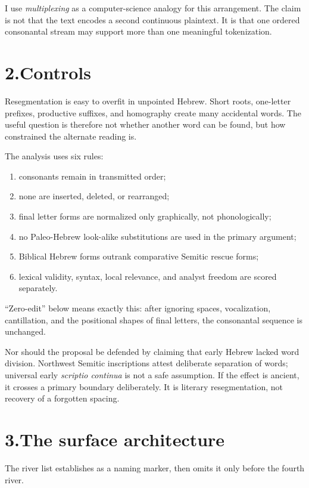 I use \emph{multiplexing} as a computer-science analogy for this arrangement. The claim is not that the text encodes a second continuous plaintext. It is that one ordered consonantal stream may support more than one meaningful tokenization.

\section*{2.\quad Controls}

Resegmentation is easy to overfit in unpointed Hebrew. Short roots, one-letter prefixes, productive suffixes, and homography create many accidental words. The useful question is therefore not whether another word can be found, but how constrained the alternate reading is.

The analysis uses six rules:

\begin{enumerate}
\item consonants remain in transmitted order;
\item none are inserted, deleted, or rearranged;
\item final letter forms are normalized only graphically, not phonologically;
\item no Paleo-Hebrew look-alike substitutions are used in the primary argument;
\item Biblical Hebrew forms outrank comparative Semitic rescue forms;
\item lexical validity, syntax, local relevance, and analyst freedom are scored separately.
\end{enumerate}

``Zero-edit'' below means exactly this: after ignoring spaces, vocalization, cantillation, and the positional shapes of final letters, the consonantal sequence is unchanged.

Nor should the proposal be defended by claiming that early Hebrew lacked word division. Northwest Semitic inscriptions attest deliberate separation of words; universal early \textit{scriptio continua} is not a safe assumption.\cite{Millard1970,Tov2012} If the effect is ancient, it crosses a primary boundary deliberately. It is literary resegmentation, not recovery of a forgotten spacing.

\section*{3.\quad The surface architecture}

The river list establishes  as a naming marker, then omits it only before the fourth river.

